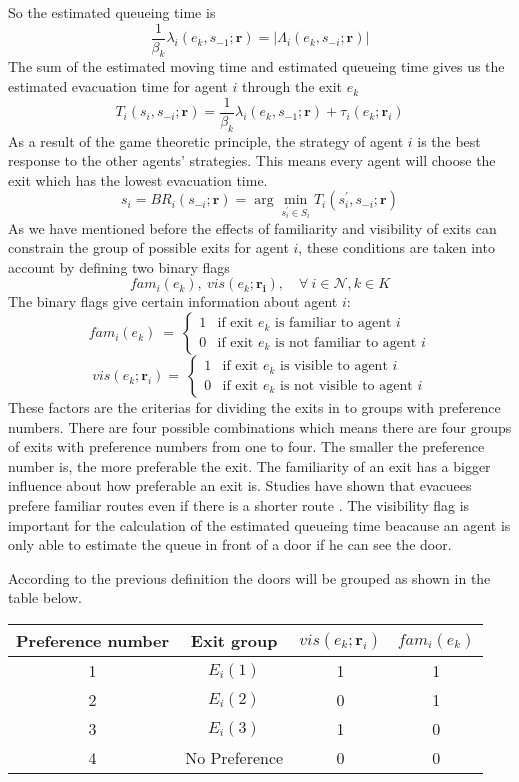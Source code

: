 So the estimated queueing time is
\[\frac{1}{\beta_k}\lambda_i(e_k,s_{-1};\mathbf{r}) = |\Lambda_i(e_k, s_{-i};\mathbf{r})|\]
The sum of the estimated moving time and estimated queueing time gives us the
estimated evacuation time for agent $i$ through the exit $e_k$
\[T_i(s_i, s_{-i};\mathbf{r}) = \frac{1}{\beta_k}\lambda_i(e_k,s_{-1};\mathbf{r}) + \tau_i(e_k;\mathbf{r}_i)\]
As a result of the game theoretic principle, the strategy of agent $i$ is the
best response to the other agents' strategies. This means every agent will
choose the exit which has the lowest evacuation time.
\[s_i = BR_i(s_{-i};\mathbf{r}) = \arg \underset{s^{\prime}_i \in S_i}{\min} T_i(s^{\prime}_i,s_{-i};\mathbf{r}) \]
As we have mentioned before the effects of familiarity and visibility of exits
can constrain the group of possible exits for agent $i$, these conditions are
taken into account by defining two binary flags
\[fam_i(e_k),\ vis(e_k;\mathbf{r_i}),\quad \forall\ i \in \mathcal{N}, k \in K\]
The binary flags give certain information about agent $i$:
\[fam_i(e_k) \ = \ 
\begin{cases} 
1 & \text{if exit\ } e_k \text{\ is familiar to agent\ } i \\
0 & \text{if exit\ } e_k \text{\ is not familiar to agent\ } i
\end{cases}\]
\[vis(e_k; \mathbf{r}_i) = \ 
\begin{cases} 
1 & \text{if exit\ } e_k \text{\ is visible to agent\ } i \\
0 & \text{if exit\ } e_k \text{\ is not visible to agent\ } i
\end{cases}\]
These factors are the criterias for dividing the exits in to groups with
preference numbers. There are four possible combinations which means there are
four groups of exits with preference numbers from one to four. The smaller the
preference number is, the more preferable the exit. The familiarity of an exit
has a bigger influence about how preferable an exit is. Studies have shown
that evacuees prefere familiar routes even if there is a shorter route
\cite{BestResponseDynamics}. The visibility flag is important for the
calculation of the estimated queueing time beacause an agent is only able to
estimate the queue in front of a door if he can see the door.

According to the previous definition the doors will be grouped as shown in the table below.
\begin{center}
\begin{tabular*}{\textwidth}{@{\extracolsep{\fill}} cccc}
	\hline
	Preference number & Exit group &  $vis(e_k; \mathbf{r}_i)$ & $fam_i(e_k)$\\ 
	\hline

	1 & $E_i(1)$ & 1 & 1\\ 

	2 & $E_i(2)$ & 0 & 1\\ 

	3 & $E_i(3)$ & 1 & 0\\ 

	4 & No Preference & 0 & 0\\
	\hline
\end{tabular*}
\end{center}

